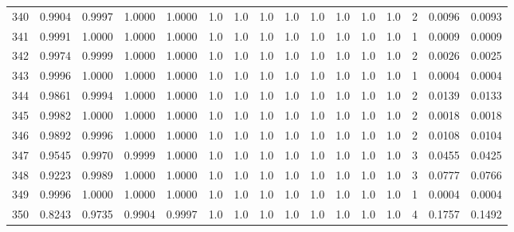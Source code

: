 \begin{tabular}{lrrrrrrrrrrrrrrr}
340 &      0.9904 &  0.9997 &  1.0000 &  1.0000 &     1.0 &     1.0 &     1.0 &     1.0 &     1.0 &     1.0 &      1.0 &        1.0 &      2 &                    0.0096 &                     0.0093 \\
341 &      0.9991 &  1.0000 &  1.0000 &  1.0000 &     1.0 &     1.0 &     1.0 &     1.0 &     1.0 &     1.0 &      1.0 &        1.0 &      1 &                    0.0009 &                     0.0009 \\
342 &      0.9974 &  0.9999 &  1.0000 &  1.0000 &     1.0 &     1.0 &     1.0 &     1.0 &     1.0 &     1.0 &      1.0 &        1.0 &      2 &                    0.0026 &                     0.0025 \\
343 &      0.9996 &  1.0000 &  1.0000 &  1.0000 &     1.0 &     1.0 &     1.0 &     1.0 &     1.0 &     1.0 &      1.0 &        1.0 &      1 &                    0.0004 &                     0.0004 \\
344 &      0.9861 &  0.9994 &  1.0000 &  1.0000 &     1.0 &     1.0 &     1.0 &     1.0 &     1.0 &     1.0 &      1.0 &        1.0 &      2 &                    0.0139 &                     0.0133 \\
345 &      0.9982 &  1.0000 &  1.0000 &  1.0000 &     1.0 &     1.0 &     1.0 &     1.0 &     1.0 &     1.0 &      1.0 &        1.0 &      2 &                    0.0018 &                     0.0018 \\
346 &      0.9892 &  0.9996 &  1.0000 &  1.0000 &     1.0 &     1.0 &     1.0 &     1.0 &     1.0 &     1.0 &      1.0 &        1.0 &      2 &                    0.0108 &                     0.0104 \\
347 &      0.9545 &  0.9970 &  0.9999 &  1.0000 &     1.0 &     1.0 &     1.0 &     1.0 &     1.0 &     1.0 &      1.0 &        1.0 &      3 &                    0.0455 &                     0.0425 \\
348 &      0.9223 &  0.9989 &  1.0000 &  1.0000 &     1.0 &     1.0 &     1.0 &     1.0 &     1.0 &     1.0 &      1.0 &        1.0 &      3 &                    0.0777 &                     0.0766 \\
349 &      0.9996 &  1.0000 &  1.0000 &  1.0000 &     1.0 &     1.0 &     1.0 &     1.0 &     1.0 &     1.0 &      1.0 &        1.0 &      1 &                    0.0004 &                     0.0004 \\
350 &      0.8243 &  0.9735 &  0.9904 &  0.9997 &     1.0 &     1.0 &     1.0 &     1.0 &     1.0 &     1.0 &      1.0 &        1.0 &      4 &                    0.1757 &                     0.1492 \\

\end{tabular}
